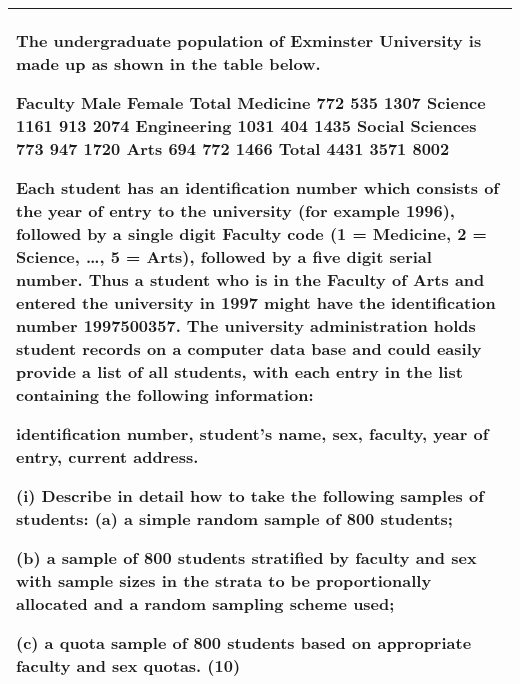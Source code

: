 \documentclass[a4paper,12pt]{article}
\begin{document}
\begin{table}[ht!]
 \centering
 \begin{tabular}{|p{15cm}|}
 \hline  
The undergraduate population of Exminster University is made up as shown in the table below. 
 
Faculty Male Female Total Medicine 772 535 1307 Science 1161 913 2074 Engineering 1031 404 1435 Social Sciences 773 947 1720 Arts 694 772 1466 Total 4431 3571 8002 
 
 Each student has an identification number which consists of the year of entry to the university (for example 1996), followed by a single digit Faculty code (1 = Medicine, 2 = Science, …, 5 = Arts), followed by a five digit serial number.  Thus a student who is in the Faculty of Arts and entered the university in 1997 might have the identification number 1997500357.  The university administration holds student records on a computer data base and could easily provide a list of all students, with each entry in the list containing the following information: 
 
   identification number, student’s name, sex, faculty, year of entry, current address. 
 
(i) Describe in detail how to take the following samples of students:    (a) a simple random sample of 800 students; 
 
(b) a sample of 800 students stratified by faculty and sex with sample sizes in the strata to be proportionally allocated and a random sampling scheme used; 
 
(c) a quota sample of 800 students based on appropriate faculty and sex quotas. (10) 
 
 \\ \hline
  \end{tabular}
\end{table}
\end{document}
